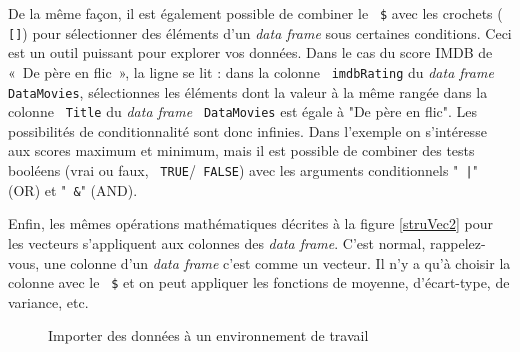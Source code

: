 \documentclass[10.5pt,a4paper]{article}
\newcommand{\rcode}[1]{\texttt{\color{rstudio} #1}}
\begin{document}
    De la même façon, il est également possible de combiner le \rcode{\$} avec les crochets (\rcode{[]}) pour sélectionner des éléments d'un \emph{data frame} sous certaines conditions. Ceci est un outil puissant pour explorer vos données. Dans le cas du score IMDB de «~De père en flic~», la ligne se lit : dans la colonne \rcode{imdbRating} du \emph{data frame} \rcode{DataMovies}, sélectionnes les éléments dont la valeur à la même rangée dans la colonne \rcode{Title} du \emph{data frame} \rcode{DataMovies} est égale à "De père en flic". Les possibilités de conditionnalité sont donc infinies. Dans l'exemple on s'intéresse aux scores maximum et minimum, mais il est possible de combiner des tests booléens (vrai ou faux, \rcode{TRUE}/\rcode{FALSE}) avec les arguments conditionnels "\rcode{|}" (OR) et "\rcode{\&}" (AND). 
  
    
    Enfin, les mêmes opérations mathématiques décrites à la figure \ref{struVec2} pour les vecteurs s'appliquent aux colonnes des \emph{data frame}. C'est normal, rappelez-vous, une colonne d'un \emph{data frame} c'est comme un vecteur. Il n'y a qu'à choisir la colonne avec le \rcode{\$} et on peut appliquer les fonctions de moyenne, d'écart-type, de variance, etc.
    
    \begin{figure}[H]
    \centering
    \caption{Importer des données à un environnement de travail}
    \label{importFig}
    \end{figure}
\end{document}
